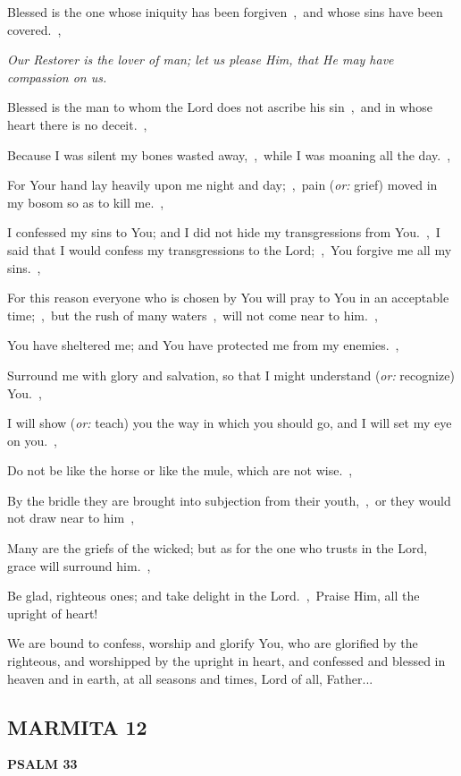 \documentclass[12pt,twoside,a5paper]{article}
\newcommand{\marmita}[1]{\subsection*{MARMITA {#1}}}
\newcommand{\psalm}[1]{\textbf{PSALM {#1}}\nopagebreak}
\newcommand{\qanona}[1]{{\liturgicalhint{Qanona.} \emph{#1}}}
\newcommand{\slota}[1]{\liturgicalhint{Slota.} #1}
\newcommand{\translationoption}[1]{\emph{or:} #1}
\begin{document}
\begin{normalparskip}
  Blessed is the one whose iniquity has been forgiven~\sep\ and whose sins have been covered.~\sep

  \qanona{Our Restorer is the lover of man; let us please Him, that He may have compassion on us.}

  Blessed is the man to whom the Lord does not ascribe his sin~\sep\ and in whose heart there is no deceit.~\sep

  Because I was silent my bones wasted away,~\sep\ while I was moaning all the day.~\sep

  For Your hand lay heavily upon me night and day;~\sep\ pain (\translationoption{grief}) moved in my bosom so as to kill me.~\sep

  I confessed my sins to You; and I did not hide my transgressions from You.~\sep\ I said that I would confess my transgressions to the Lord;~\sep\ You forgive me all my sins.~\sep

  For this reason everyone who is chosen by You will pray to You in an acceptable time;~\sep\ but the rush of many waters~\sep\ will not come near to him.~\sep

  You have sheltered me; and You have protected me from my enemies.~\sep

  Surround me with glory and salvation, so that I might understand (\translationoption{recognize}) You.~\sep

  I will show (\translationoption{teach}) you the way in which you should go, and I will set my eye on you.~\sep

  Do not be like the horse or like the mule, which are not wise.~\sep

  By the bridle they are brought into subjection from their youth,~\sep\ or they would not draw near to him~\sep

  Many are the griefs of the wicked; but as for the one who trusts in the Lord, grace will surround him.~\sep

  Be glad, righteous ones; and take delight in the Lord.~\sep\ Praise Him, all the upright of heart!
\end{normalparskip}

\slota{We are bound to confess, worship and glorify You, who are glorified by the righteous, and worshipped by the upright in heart, and confessed and blessed in heaven and in earth, at all seasons and times, Lord of all, Father...}

\marmita{12}

\psalm{33}
\end{document}
